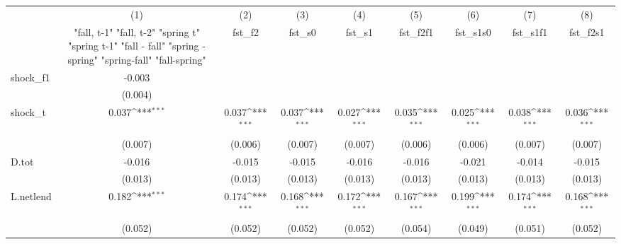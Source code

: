 {
\def\sym#1{\ifmmode^{#1}\else\(^{#1}\)\fi}
\begin{tabular}{l*{8}{c}}
\toprule
            &\multicolumn{1}{c}{(1)}&\multicolumn{1}{c}{(2)}&\multicolumn{1}{c}{(3)}&\multicolumn{1}{c}{(4)}&\multicolumn{1}{c}{(5)}&\multicolumn{1}{c}{(6)}&\multicolumn{1}{c}{(7)}&\multicolumn{1}{c}{(8)}\\
            &\multicolumn{1}{c}{  "fall, t-1" "fall, t-2" "spring t" "spring t-1"  "fall - fall" "spring - spring" "spring-fall" "fall-spring" }&\multicolumn{1}{c}{fst\_f2}&\multicolumn{1}{c}{fst\_s0}&\multicolumn{1}{c}{fst\_s1}&\multicolumn{1}{c}{fst\_f2f1}&\multicolumn{1}{c}{fst\_s1s0}&\multicolumn{1}{c}{fst\_s1f1}&\multicolumn{1}{c}{fst\_f2s1}\\
\midrule
shock\_f1    &      -0.003         &                     &                     &                     &                     &                     &                     &                     \\
            &     (0.004)         &                     &                     &                     &                     &                     &                     &                     \\
\addlinespace
shock\_t     &       0.037\sym{***}&       0.037\sym{***}&       0.037\sym{***}&       0.027\sym{***}&       0.035\sym{***}&       0.025\sym{***}&       0.038\sym{***}&       0.036\sym{***}\\
            &     (0.007)         &     (0.006)         &     (0.007)         &     (0.007)         &     (0.006)         &     (0.006)         &     (0.007)         &     (0.007)         \\
\addlinespace
D.tot       &      -0.016         &      -0.015         &      -0.015         &      -0.016         &      -0.016         &      -0.021         &      -0.014         &      -0.015         \\
            &     (0.013)         &     (0.013)         &     (0.013)         &     (0.013)         &     (0.013)         &     (0.013)         &     (0.013)         &     (0.013)         \\
\addlinespace
L.netlend   &       0.182\sym{***}&       0.174\sym{***}&       0.168\sym{***}&       0.172\sym{***}&       0.167\sym{***}&       0.199\sym{***}&       0.174\sym{***}&       0.168\sym{***}\\
            &     (0.052)         &     (0.052)         &     (0.052)         &     (0.052)         &     (0.054)         &     (0.049)         &     (0.051)         &     (0.052)         \\

\end{tabular}}
